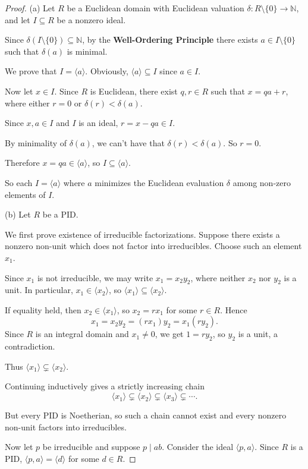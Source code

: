 \documentclass[addpoints,10pt]{exam}
\theoremstyle{plain}
\theoremstyle{definition}
\theoremstyle{plain}
\theoremstyle{definition}
\newcommand{\NN}{\ensuremath{\mathbb{N}}}
\begin{document}
\begin{proof}
(a)
Let $R$ be a Euclidean domain with Euclidean valuation
$\delta:R\setminus\{0\}\to\NN$, and let $I\subseteq R$ be a nonzero ideal.

Since $\delta(I\setminus\{0\})\subseteq\NN$, by the \textbf{Well-Ordering Principle} there exists $a\in I\setminus\{0\}$ such that $\delta(a)$ is
minimal.

We prove that $I=\langle a\rangle$. Obviously, $\langle a\rangle\subseteq I$ since $a\in I.$

Now let $x\in I$. Since $R$ is Euclidean, there exist $q,r\in R$ such
that
$x=qa+r$,
where either $r=0$ or $\delta(r)<\delta(a)$.

Since $x,a\in I$ and $I$ is an ideal,
$r=x-qa\in I$.

By minimality of $\delta(a)$, we can't have that $\delta(r)<\delta(a)$. So $r=0$.

Therefore $x=qa\in\langle a\rangle$, so
$I\subseteq\langle a\rangle$.

So each $I=\langle a\rangle$ where $a$ minimizes the Euclidean evaluation $\delta$ among non-zero elements of $I$.

(b)
Let $R$ be a PID.

We first prove existence of irreducible factorizations. Suppose there
exists a nonzero non-unit which does not factor into irreducibles.
Choose such an element $x_1$.

Since $x_1$ is not irreducible, we may write
$x_1=x_2y_2$,
where neither $x_2$ nor $y_2$ is a unit. In particular,
$x_1\in\langle x_2\rangle$, so
$\langle x_1\rangle\subseteq\langle x_2\rangle$.

If equality held, then
$x_2\in\langle x_1\rangle$, so
$x_2=rx_1$
for some $r\in R$. Hence
\[
x_1=x_2y_2=(rx_1)y_2=x_1(ry_2).
\]
Since $R$ is an integral domain and $x_1\neq 0$, we get
$1=ry_2$, so $y_2$ is a unit, a contradiction.

Thus
$\langle x_1\rangle\subsetneq\langle x_2\rangle$.

Continuing inductively gives a strictly increasing chain
\[
\langle x_1\rangle
\subsetneq
\langle x_2\rangle
\subsetneq
\langle x_3\rangle
\subsetneq
\cdots.
\]

But every PID is Noetherian, so such a chain cannot exist and every
nonzero non-unit factors into irreducibles.

Now let $p$ be irreducible and suppose $p\mid ab$. Consider the ideal
$\langle p,a\rangle$. Since $R$ is a PID,
$\langle p,a\rangle=\langle d\rangle$
for some $d\in R$.


\end{proof}
\end{document}
